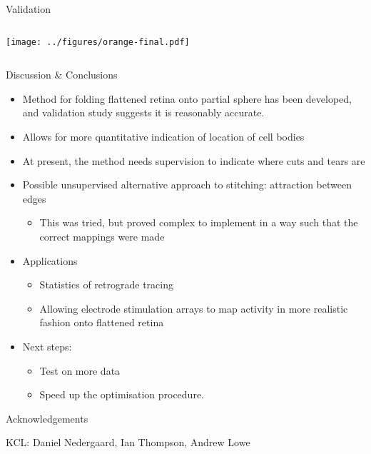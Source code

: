 \documentclass[final,hyperref={pdfpagelabels=false}]{beamer}
\begin{document}
\begin{frame}{}
\begin{columns}[T]
\begin{column}{.33\linewidth}
\begin{block}{Validation}
\begin{columns}
          \texttt{[image: ../figures/orange-final.pdf]}

        \end{columns}
      \end{block}

      \begin{block}{Discussion \& Conclusions}
        \begin{itemize}
        \item Method for folding flattened retina onto partial sphere has
          been developed, and validation study suggests it is
          reasonably accurate.
        \item Allows for more quantitative indication of location of
          cell bodies  
        \item At present, the method needs supervision to indicate where cuts
          and tears are
        \item Possible unsupervised alternative approach to stitching:
          attraction between edges
          \begin{itemize}
          \item This was tried, but proved complex to implement in a
            way such that the correct mappings were made
          \end{itemize}
        \item Applications
          \begin{itemize}
          \item Statistics of retrograde tracing
          \item Allowing electrode stimulation arrays to map activity
            in more realistic fashion onto flattened retina
          \end{itemize}
        \item Next steps:
          \begin{itemize}
          \item Test on more data
          \item Speed up the optimisation procedure.
          \end{itemize}
        \end{itemize}
      \end{block}

      \begin{block}{Acknowledgements}

        KCL: Daniel Nedergaard, Ian Thompson, Andrew Lowe


\end{block}
\end{column}
\end{columns}
\end{frame}
\end{document}
